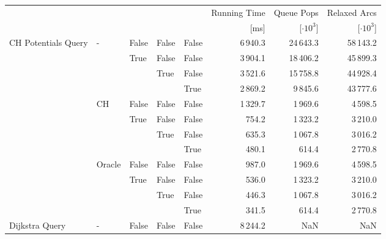 \begin{tabular}{lllllrrr}
\toprule
 & & & & & Running Time &     Queue Pops &   Relaxed Arcs \\
 & & & & &         [ms] & [$\cdot 10^3$] & [$\cdot 10^3$] \\
\midrule
CH Potentials Query & - & False & False & False &           6\,940.3 &         24\,643.3 &           58\,143.2 \\
               &   & True  & False & False &           3\,904.1 &         18\,406.2 &           45\,899.3 \\
               &   &       & True  & False &           3\,521.6 &         15\,758.8 &           44\,928.4 \\
               &   &       &       & True  &           2\,869.2 &          9\,845.6 &           43\,777.6 \\
               & CH & False & False & False &           1\,329.7 &          1\,969.6 &            4\,598.5 \\
               &   & True  & False & False &            754.2 &          1\,323.2 &            3\,210.0 \\
               &   &       & True  & False &            635.3 &          1\,067.8 &            3\,016.2 \\
               &   &       &       & True  &            480.1 &           614.4 &            2\,770.8 \\
               & Oracle & False & False & False &            987.0 &          1\,969.6 &            4\,598.5 \\
               &   & True  & False & False &            536.0 &          1\,323.2 &            3\,210.0 \\
               &   &       & True  & False &            446.3 &          1\,067.8 &            3\,016.2 \\
               &   &       &       & True  &            341.5 &           614.4 &            2\,770.8 \\
Dijkstra Query & - & False & False & False &           8\,244.2 &             NaN &               NaN \\
\bottomrule
\end{tabular}

